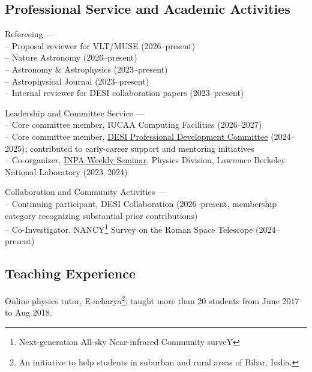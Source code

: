 \documentclass[11pt,letterpaper]{article}
\begin{document}
\subsection{Professional Service and Academic Activities}
\begin{list}{}{\cvlist}
\item Refereeing --- \\
-- Proposal reviewer for VLT/MUSE (2026--present)\\
-- Nature Astronomy (2026--present)\\
-- Astronomy \& Astrophysics (2023--present)\\
-- Astrophysical Journal (2023--present)\\
-- Internal reviewer for DESI collaboration papers (2023--present)

\item Leadership and Committee Service --- \\
-- Core committee member, IUCAA Computing Facilities (2026--2027)\\
-- Core committee member, \href{https://desi.lbl.gov/trac/wiki/PublicPages/Contacts#ProfessionalDevelopmentCommittee}{DESI Professional Development Committee} (2024--2025); contributed to early-career support and mentoring initiatives\\
-- Co-organizer, \href{https://inpa.lbl.gov/events/}{INPA Weekly Seminar}, Physics Division, Lawrence Berkeley National Laboratory (2023--2024)

\item Collaboration and Community Activities --- \\
-- Continuing participant, DESI Collaboration (2026--present, membership category recognizing substantial prior contributions)\\
-- Co-Investigator, NANCY\footnote{Next-generation All-sky Near-infrared Community surveY} Survey on the Roman Space Telescope (2024--present)
\end{list}

\vspace{-1.5mm}
\subsection{Teaching Experience}
\begin{list}{}{\cvlist}
\item Online physics tutor, E-acharya\footnote{An initiative to help students in suburban and rural areas of Bihar, India.}; taught more than 20 students from June 2017 to Aug 2018.
\end{list}
\end{document}
